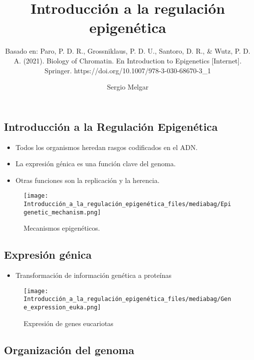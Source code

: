 \documentclass[
  letterpaper,
  DIV=11,
  numbers=noendperiod]{scrartcl}
\title{Introducción a la regulación epigenética}
\subtitle{Basado en: Paro, P. D. R., Grossniklaus, P. D. U., Santoro, D.
R., \& Wutz, P. D. A. (2021). Biology of Chromatin. En Introduction to
Epigenetics {[}Internet{]}. Springer.
https://doi.org/10.1007/978-3-030-68670-3\_1}
\author{Sergio Melgar}
\date{}
\providecommand{\tightlist}{%
  \setlength{\itemsep}{0pt}\setlength{\parskip}{0pt}}\usepackage{longtable,booktabs,array}
\begin{document}
\maketitle


\subsection{Introducción a la Regulación
Epigenética}\label{introducciuxf3n-a-la-regulaciuxf3n-epigenuxe9tica}

\begin{itemize}
\item
  Todos los organismos heredan rasgos codificados en el ADN.
\item
  La expresión génica es una función clave del genoma.
\item
  Otras funciones son la replicación y la herencia.
\end{itemize}

\begin{figure}[H]

{\centering \texttt{[image: Introducción\_a\_la\_regulación\_epigenética\_files/mediabag/Epigenetic\_mechanism.png]}

}

\caption{Mecanismos epigenéticos.}

\end{figure}%

\subsection{Expresión génica}\label{expresiuxf3n-guxe9nica}

\begin{itemize}
\tightlist
\item
  Transformación de información genética a proteínas
\end{itemize}

\begin{figure}[H]

{\centering \texttt{[image: Introducción\_a\_la\_regulación\_epigenética\_files/mediabag/Gene\_expression\_euka.png]}

}

\caption{Expresión de genes eucariotas}

\end{figure}%

\subsection{Organización del genoma}\label{organizaciuxf3n-del-genoma}
\end{document}
